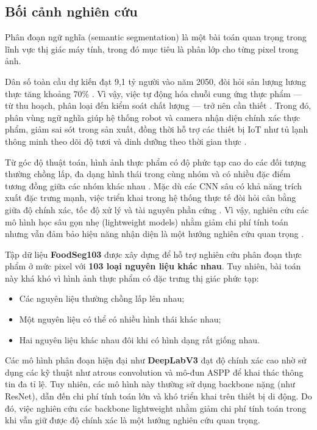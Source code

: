 \subsection{Bối cảnh nghiên cứu}

Phân đoạn ngữ nghĩa (semantic segmentation) là một bài toán quan trọng trong lĩnh vực thị giác máy tính, trong đó mục tiêu là phân lớp cho từng pixel trong ảnh.

Dân số toàn cầu dự kiến đạt 9,1 tỷ người vào năm 2050, đòi hỏi sản lượng lương thực tăng khoảng 70\% \cite{godfray2010foodsecurity, alexandratos1995world}. Vì vậy, việc tự động hóa chuỗi cung ứng thực phẩm --- từ thu hoạch, phân loại đến kiểm soát chất lượng --- trở nên cần thiết \cite{mahalik2010trends, stemmer2018vision}. Trong đó, phân vùng ngữ nghĩa giúp hệ thống robot và camera nhận diện chính xác thực phẩm, giảm sai sót trong sản xuất, đồng thời hỗ trợ các thiết bị IoT như tủ lạnh thông minh theo dõi độ tươi và dinh dưỡng theo thời gian thực \cite{gao2019smartfridge, wang2019smartrefrigerator}.

Từ góc độ thuật toán, hình ảnh thực phẩm có độ phức tạp cao do các đối tượng thường chồng lấp, đa dạng hình thái trong cùng nhóm và có nhiều đặc điểm tương đồng giữa các nhóm khác nhau \cite{zhuang2020transfer}. Mặc dù các CNN sâu có khả năng trích xuất đặc trưng mạnh, việc triển khai trong hệ thống thực tế đòi hỏi cân bằng giữa độ chính xác, tốc độ xử lý và tài nguyên phần cứng \cite{he2015residual}. Vì vậy, nghiên cứu các mô hình học sâu gọn nhẹ (lightweight models) nhằm giảm chi phí tính toán nhưng vẫn đảm bảo hiệu năng nhận diện là một hướng nghiên cứu quan trọng \cite{dong2020mobilenetv2}.

Tập dữ liệu \textbf{FoodSeg103} được xây dựng để hỗ trợ nghiên cứu phân đoạn thực phẩm ở mức pixel với \textbf{103 loại nguyên liệu khác nhau}. Tuy nhiên, bài toán này khá khó vì hình ảnh thực phẩm có đặc trưng thị giác phức tạp:
\begin{itemize}
    \item Các nguyên liệu thường chồng lấp lên nhau;
    \item Một nguyên liệu có thể có nhiều hình thái khác nhau;
    \item Hai nguyên liệu khác nhau đôi khi có hình dạng rất giống nhau.
\end{itemize}

Các mô hình phân đoạn hiện đại như \textbf{DeepLabV3} đạt độ chính xác cao nhờ sử dụng các kỹ thuật như atrous convolution và mô-đun ASPP để khai thác thông tin đa tỉ lệ. Tuy nhiên, các mô hình này thường sử dụng backbone nặng (như ResNet), dẫn đến chi phí tính toán lớn và khó triển khai trên thiết bị di động. Do đó, việc nghiên cứu các backbone lightweight nhằm giảm chi phí tính toán trong khi vẫn giữ được độ chính xác là một hướng nghiên cứu quan trọng.

